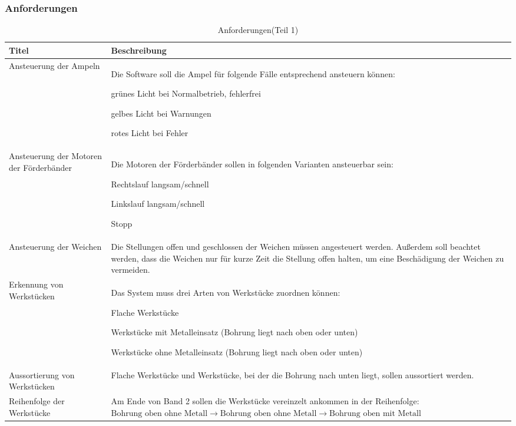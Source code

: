 \documentclass[a4paper, 11pt]{article}
\newcommand{\su}{\glqq} %
\newcommand{\so}{\grqq\xspace} %
\begin{document}
\newpage

\subsubsection{Anforderungen}
\begin{table}[h]
\center
\begin{tabularx}{\textwidth}{|X|X|}
\hline
\textbf{Titel}&\textbf{Beschreibung}\\
\hline
Ansteuerung der Ampeln&Die Software soll die Ampel für folgende Fälle entsprechend ansteuern können:
\begin{compactenum}[-]
\item grünes Licht bei Normalbetrieb, fehlerfrei 
\item gelbes Licht bei Warnungen 
\item rotes Licht bei Fehler 
\end{compactenum}\\
\hline
Ansteuerung der Motoren der Förderbänder&Die Motoren der Förderbänder sollen in folgenden Varianten ansteuerbar sein: 
\begin{compactenum}[-]
\item Rechtslauf langsam/schnell
\item Linkslauf langsam/schnell
\item Stopp
\end{compactenum}\\
\hline
Ansteuerung der Weichen&Die Stellungen \su offen\so und \su geschlossen\so der Weichen müssen angesteuert werden. Außerdem soll beachtet werden, dass die Weichen nur für kurze Zeit die Stellung \su offen\so halten, um eine Beschädigung der Weichen zu vermeiden.\\
\hline
Erkennung von Werkstücken&Das System muss drei Arten von Werkstücke zuordnen können: 
\begin{compactenum}[-]
\item Flache Werkstücke 
\item Werkstücke mit Metalleinsatz (Bohrung liegt nach oben oder unten) 
\item Werkstücke ohne Metalleinsatz (Bohrung liegt nach oben oder unten)
\end{compactenum}\\
\hline
Aussortierung von Werkstücken&Flache Werkstücke und Werkstücke, bei der die Bohrung nach unten liegt, sollen aussortiert werden. \\
\hline
Reihenfolge der Werkstücke&Am Ende von Band 2 sollen die Werkstücke vereinzelt ankommen in der Reihenfolge:\hspace{2cm}
$\text{Bohrung oben ohne Metall}\rightarrow \text{Bohrung oben ohne Metall}\rightarrow \text{Bohrung oben mit Metall}$ \\
\hline
\end{tabularx}
\caption{Anforderungen(Teil 1)}
\label{anf1}
\end{table}
\end{document}
